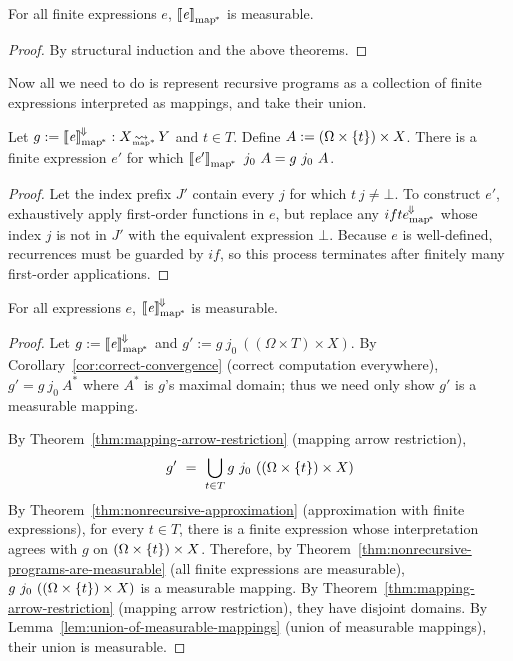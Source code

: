\begin{theorem}
\label{thm:nonrecursive-programs-are-measurable}
For all finite expressions $\mathit{e}$, $\left\llbracket{\mathit{e}}\right\rrbracket_\mathrm{map^{\mspace{-2mu}*}}$ is measurable.%
\end{theorem}
\begin{proof}
By structural induction and the above theorems.
\end{proof}

Now all we need to do is represent recursive programs as a collection of finite expressions interpreted as mappings, and take their union.

\begin{theorem}
\label{thm:nonrecursive-approximation}
Let $g := \left\llbracket{\mathit{e}}\right\rrbracket^{\mspace{-2mu}\Downarrow\mspace{-2mu}}_\mathrm{map^{\mspace{-2mu}*}} : X \operatorname{\rightsquigarrow_{\mspace{-25mu}_{\mathrm{map*}}}} Y$ and $t \in T$.
Define $A := (\Omega \times \{{t}\}) \times X$.
There is a finite expression $\mathit{e'}$ for which $\left\llbracket{\mathit{e'}}\right\rrbracket_\mathrm{map^{\mspace{-2mu}*}}~j_0~A = g~j_0~A$.%
\end{theorem}
\begin{proof}
Let the index prefix $J'$ contain every $j$ for which $t~j \neq \bot$.
To construct $\mathit{e'}$, exhaustively apply first-order functions in $\mathit{e}$, but replace any $ifte^{\mspace{-2mu}\Downarrow\mspace{-2mu}}_\mathrm{map^{\mspace{-2mu}*}}$ whose index $j$ is not in $J'$ with the equivalent expression $\bot$.
Because $\mathit{e}$ is well-defined, recurrences must be guarded by $if$, so this process terminates after finitely many first-order applications.
\end{proof}

\begin{theorem}
\label{thm:everything-is-measurable}
For all expressions $\mathit{e}$, $\left\llbracket{\mathit{e}}\right\rrbracket^{\mspace{-2mu}\Downarrow\mspace{-2mu}}_\mathrm{map^{\mspace{-2mu}*}}$ is measurable.%
\end{theorem}
\begin{proof}
Let $g := \left\llbracket{\mathit{e}}\right\rrbracket^{\mspace{-2mu}\Downarrow\mspace{-2mu}}_\mathrm{map^{\mspace{-2mu}*}}$ and $g' := g~j_0~((\Omega \times T) \times X)$.
By Corollary~\ref{cor:correct-convergence} (correct computation everywhere), $g' = g~j_0~A^*$ where $A^*$ is $g$'s maximal domain; thus we need only show $g'$ is a measurable mapping.

By Theorem~\ref{thm:mapping-arrow-restriction} (mapping arrow restriction),
\begin{equation}
	g' \ =\ \bigcup\limits_{t \in T} g~j_0~((\Omega \times \set{t}) \times X)
\end{equation}
By Theorem~\ref{thm:nonrecursive-approximation} (approximation with finite expressions), for every $t \in T$, there is a finite expression whose interpretation agrees with $g$ on $(\Omega \times \{{t}\}) \times X$.
Therefore, by Theorem~\ref{thm:nonrecursive-programs-are-measurable} (all finite expressions are measurable), $g~j_0~((\Omega \times \{{t}\}) \times X)$ is a measurable mapping.
By Theorem~\ref{thm:mapping-arrow-restriction} (mapping arrow restriction), they have disjoint domains.
By Lemma~\ref{lem:union-of-measurable-mappings} (union of measurable mappings), their union is measurable.
\end{proof}

